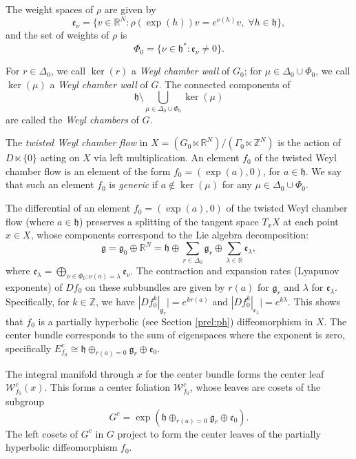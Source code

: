 \documentclass[11pt]{amsart}
\numberwithin{equation}{section}
\newcommand{\R}{\mathbb{R}}
\newcommand{\Z}{\mathbb{Z}}
\newcommand{\W}{\mathcal{W}}
\theoremstyle{plain}
\begin{document}
The weight spaces of $\rho$ are given by
\[
\mathfrak{e}_\nu = \{ v \in \mathbb{R}^N : \rho(\exp(h))v = e^{\nu(h)}v, \; \forall h \in \mathfrak{h} \},
\]
and the set of weights of $\rho $ is
\[
\Phi_0 = \{ \nu \in \mathfrak{h}^* : \mathfrak{e}_\nu \neq 0 \}.
\]


For $r \in \Delta_0$, we call $\ker(r)$ a \emph{Weyl chamber wall} of $G_0$; for $\mu \in \Delta_0 \cup \Phi_0$, we call $\ker(\mu)$ a \emph{Weyl chamber wall} of $G$. The connected components of
\[
\mathfrak{h} \setminus \bigcup_{\mu \in \Delta_0 \cup \Phi_0} \ker(\mu)
\]
are called the \emph{Weyl chambers} of $G$.

The \emph{twisted Weyl chamber flow} in $X=(G_0\ltimes \R^N)/(\Gamma_0\ltimes \Z^N)$ is the action of $D\ltimes \{0\}$ acting on $X$ via left multiplication. An element $f_0$ of the twisted Weyl chamber flow is an element of the form $f_0=(\exp(a), 0)$, for $a \in \mathfrak{h}$. We say that such an element $f_0$ is \emph{generic} if $a \notin \ker(\mu)$ for any $\mu \in \Delta_0 \cup \Phi_0$.

The differential of an element $f_0 = (\exp(a), 0)$ of the twisted Weyl chamber flow (where $a \in \mathfrak{h}$) preserves a splitting of the tangent space $T_x X$ at each point $x \in X$, whose components correspond to the Lie algebra decomposition:
\[
\mathfrak{g} = \mathfrak{g}_0 \oplus \mathbb{R}^N = \mathfrak{h} \oplus \sum_{r \in \Delta_0} \mathfrak{g}_r \oplus \sum_{\lambda \in \mathbb{R}} \mathfrak{e}_{\lambda},
\]
where $\mathfrak{e}_{\lambda} = \bigoplus_{\nu \in \Phi_0 : \nu(a) = \lambda} \mathfrak{e}_\nu$.
The contraction and expansion rates (Lyapunov exponents) of $Df_0$ on these subbundles are given by $r(a)$ for $\mathfrak{g}_r$ and $\lambda$ for $\mathfrak{e}_\lambda$. Specifically, for $k \in \mathbb{Z}$, we have $|Df_0^k|_{\mathfrak{g}_r}| = e^{k r(a)}$ and $|Df_0^k|_{\mathfrak{e}_\lambda}| = e^{k \lambda}$. This shows that $f_0$ is a partially hyperbolic (see Section \ref{prel:ph}) diffeomorphism  in $X$. The center bundle corresponds to the sum of eigenspaces where the exponent is zero, specifically $E^c_{f_0}\cong \mathfrak{h} \oplus_{r(a)=0} \mathfrak g_r\oplus \mathfrak{e}_0$.

The integral manifold through $x$ for the center bundle forms the center leaf $\mathcal{W}^c_{f_0}(x)$. This forms a center foliation $\W^c_{f_0}$, whose leaves are cosets of
the  subgroup \[
G^c = \exp(\mathfrak{h} \oplus_{r(a)=0} \mathfrak g_r\oplus \mathfrak{e}_0).\] The left cosets of $G^c$ in $G$ project to form the center leaves of the partially hyperbolic diffeomorphism $f_0$.
\end{document}
